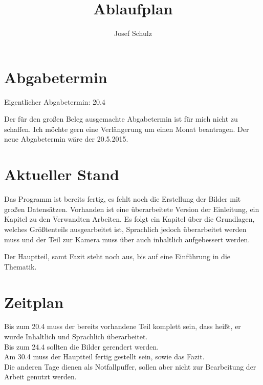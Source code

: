 \documentclass[]{article}
\title{Ablaufplan}
\author{Josef Schulz}
\begin{document}
\maketitle

\section{Abgabetermin}

Eigentlicher Abgabetermin: 20.4

\vspace{1cm}

\noindent Der für den großen Beleg ausgemachte Abgabetermin ist für mich nicht zu schaffen.
Ich möchte gern eine Verlängerung um einen Monat beantragen. Der neue Abgabetermin
wäre der 20.5.2015.

\section{Aktueller Stand}

Das Programm ist bereits fertig, es fehlt noch die Erstellung der Bilder mit großen Datensätzen.
Vorhanden ist eine überarbeitete Version der Einleitung, ein Kapitel zu den Verwandten Arbeiten.
Es folgt ein Kapitel über die Grundlagen, welches Größtenteils ausgearbeitet ist, Sprachlich
jedoch überarbeitet werden muss und der Teil zur Kamera muss über auch inhaltlich aufgebessert werden.

Der Hauptteil, samt Fazit steht noch aus, bis auf eine Einführung in die Thematik. 

\section{Zeitplan}

Bis zum 20.4 muss der bereits vorhandene Teil komplett sein, dass heißt, er wurde Inhaltlich und Sprachlich
überarbeitet. \\

\noindent Bis zum 24.4 sollten die Bilder gerendert werden. \\

\noindent Am 30.4 muss der Hauptteil fertig gestellt sein, sowie das Fazit. \\

\noindent Die anderen Tage dienen als Notfallpuffer, sollen aber nicht zur Bearbeitung der Arbeit genutzt werden. 
\end{document}
